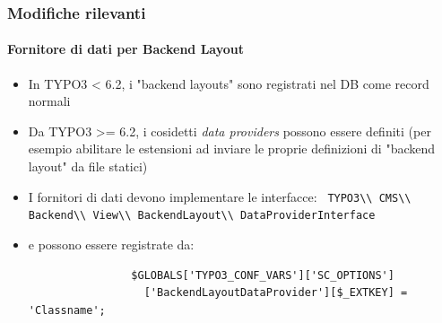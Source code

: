 
\begin{frame}[fragile]
	\frametitle{Modifiche rilevanti}
	\framesubtitle{Fornitore di dati per Backend Layout}

	\begin{itemize}
		\item In TYPO3 < 6.2, i "backend layouts" sono registrati nel DB come record normali
		\item Da TYPO3 >= 6.2, i cosidetti \emph{data providers} possono essere definiti\newline
			\small(per esempio abilitare le estensioni ad inviare le proprie definizioni di "backend layout" da file statici)\normalsize

		\item I fornitori di dati devono implementare le interfacce:\newline
			\smaller\texttt{
				TYPO3\textbackslash\textbackslash
				CMS\textbackslash\textbackslash
				Backend\textbackslash\textbackslash
				View\textbackslash\textbackslash
				BackendLayout\textbackslash\textbackslash
				DataProviderInterface}\normalsize

		\item e possono essere registrate da:

			\begin{lstlisting}
				$GLOBALS['TYPO3_CONF_VARS']['SC_OPTIONS']
				  ['BackendLayoutDataProvider'][$_EXTKEY] = 'Classname';
			\end{lstlisting}


	\end{itemize}

\end{frame}



